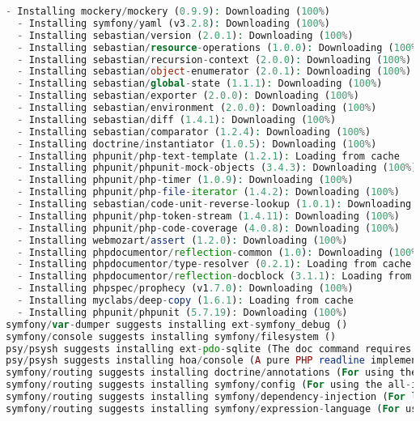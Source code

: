 \begin{lstlisting}[language=PHP]
  - Installing mockery/mockery (0.9.9): Downloading (100%)         
  - Installing symfony/yaml (v3.2.8): Downloading (100%)         
  - Installing sebastian/version (2.0.1): Downloading (100%)         
  - Installing sebastian/resource-operations (1.0.0): Downloading (100%)         
  - Installing sebastian/recursion-context (2.0.0): Downloading (100%)         
  - Installing sebastian/object-enumerator (2.0.1): Downloading (100%)         
  - Installing sebastian/global-state (1.1.1): Downloading (100%)         
  - Installing sebastian/exporter (2.0.0): Downloading (100%)         
  - Installing sebastian/environment (2.0.0): Downloading (100%)         
  - Installing sebastian/diff (1.4.1): Downloading (100%)         
  - Installing sebastian/comparator (1.2.4): Downloading (100%)         
  - Installing doctrine/instantiator (1.0.5): Downloading (100%)         
  - Installing phpunit/php-text-template (1.2.1): Loading from cache
  - Installing phpunit/phpunit-mock-objects (3.4.3): Downloading (100%)         
  - Installing phpunit/php-timer (1.0.9): Downloading (100%)         
  - Installing phpunit/php-file-iterator (1.4.2): Downloading (100%)         
  - Installing sebastian/code-unit-reverse-lookup (1.0.1): Downloading (100%)         
  - Installing phpunit/php-token-stream (1.4.11): Downloading (100%)         
  - Installing phpunit/php-code-coverage (4.0.8): Downloading (100%)         
  - Installing webmozart/assert (1.2.0): Downloading (100%)         
  - Installing phpdocumentor/reflection-common (1.0): Downloading (100%)         
  - Installing phpdocumentor/type-resolver (0.2.1): Loading from cache
  - Installing phpdocumentor/reflection-docblock (3.1.1): Loading from cache
  - Installing phpspec/prophecy (v1.7.0): Downloading (100%)         
  - Installing myclabs/deep-copy (1.6.1): Loading from cache
  - Installing phpunit/phpunit (5.7.19): Downloading (100%)         
symfony/var-dumper suggests installing ext-symfony_debug ()
symfony/console suggests installing symfony/filesystem ()
psy/psysh suggests installing ext-pdo-sqlite (The doc command requires SQLite to work.)
psy/psysh suggests installing hoa/console (A pure PHP readline implementation. You'll want this if your PHP install doesn't already support readline or libedit.)
symfony/routing suggests installing doctrine/annotations (For using the annotation loader)
symfony/routing suggests installing symfony/config (For using the all-in-one router or any loader)
symfony/routing suggests installing symfony/dependency-injection (For loading routes from a service)
symfony/routing suggests installing symfony/expression-language (For using expression matching)

\end{lstlisting}
